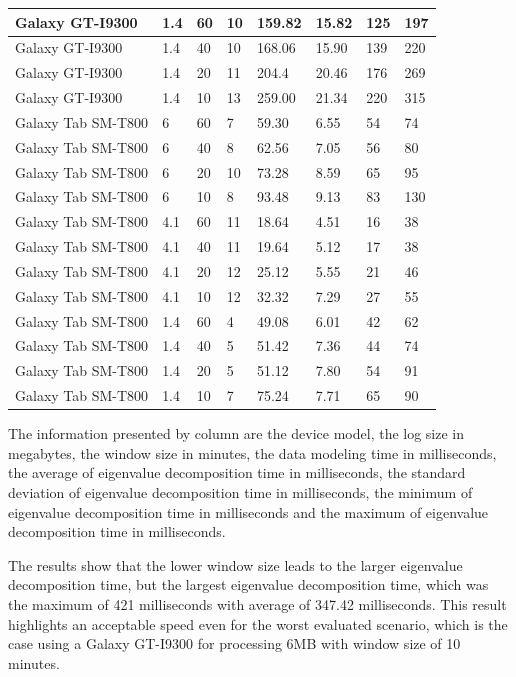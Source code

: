 \begin{table}
\begin{tabular}{|l|l|l|l|l|l|l|l|}
		Galaxy GT-I9300	& 1.4	& 60	& 10	& 159.82	& 15.82	& 125	& 197	\\ \hline
		Galaxy GT-I9300	& 1.4	& 40	& 10	& 168.06	& 15.90	& 139	& 220	\\ \hline
		Galaxy GT-I9300	& 1.4	& 20	& 11	& 204.4	& 20.46	& 176	& 269	\\ \hline
		Galaxy GT-I9300	& 1.4	& 10	& 13	& 259.00	& 21.34	& 220	& 315	\\ \hline
		Galaxy Tab SM-T800	& 6	& 60	& 7	& 59.30	& 6.55	& 54	& 74	\\ \hline
		Galaxy Tab SM-T800	& 6	& 40	& 8	& 62.56	& 7.05	& 56	& 80	\\ \hline
		Galaxy Tab SM-T800	& 6	& 20	& 10	& 73.28	& 8.59	& 65	& 95	\\ \hline
		Galaxy Tab SM-T800	& 6	& 10	& 8	& 93.48	& 9.13	& 83	& 130	\\ \hline
		Galaxy Tab SM-T800	& 4.1	& 60	& 11	& 18.64	& 4.51	& 16	& 38	\\ \hline
		Galaxy Tab SM-T800	& 4.1	& 40	& 11	& 19.64	& 5.12	& 17	& 38	\\ \hline
		Galaxy Tab SM-T800	& 4.1	& 20	& 12	& 25.12	& 5.55	& 21	& 46	\\ \hline
		Galaxy Tab SM-T800	& 4.1	& 10	& 12	& 32.32	& 7.29	& 27	& 55	\\ \hline
		Galaxy Tab SM-T800	& 1.4	& 60	& 4	& 49.08	& 6.01	& 42	& 62	\\ \hline
		Galaxy Tab SM-T800	& 1.4	& 40	& 5	& 51.42	& 7.36	& 44	& 74	\\ \hline
		Galaxy Tab SM-T800	& 1.4	& 20	& 5	& 51.12	& 7.80	& 54	& 91	\\ \hline
		Galaxy Tab SM-T800	& 1.4	& 10	& 7	& 75.24	& 7.71	& 65	& 90	\\ \hline
	\end{tabular}
\end{table}

The information presented by column are the device model, the log size in megabytes, the window size in minutes, the data modeling time in milliseconds, the average of eigenvalue decomposition time in milliseconds, the standard deviation of eigenvalue decomposition time in milliseconds, the minimum of eigenvalue decomposition time in milliseconds and the maximum of eigenvalue decomposition time in milliseconds.

The results show that the lower window size leads to the larger eigenvalue decomposition time, but the largest eigenvalue decomposition time, which was the maximum of 421 milliseconds with average of 347.42 milliseconds. This result highlights an acceptable speed even for the worst evaluated scenario, which is the case using a Galaxy GT-I9300 for processing 6MB with window size of 10 minutes.

